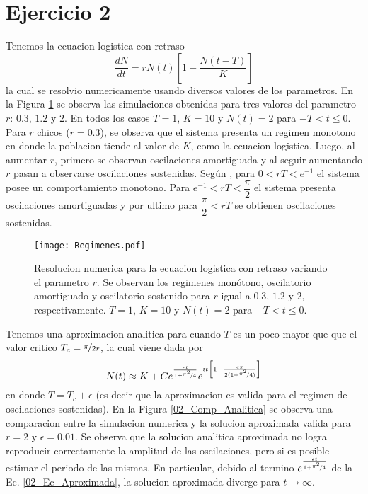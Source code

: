 \section*{Ejercicio 2}
\graphicspath{{Figuras/ej_02/}}

Tenemos la ecuacion logistica con retraso
\begin{equation}
    \frac{dN}{dt} = r N(t) \left[1- \frac{N(t-T)}{K}\right]
\end{equation}
la cual se resolvio numericamente usando diversos valores de los parametros. En la Figura \ref{02_ejercicio} se observa las simulaciones obtenidas para tres valores del parametro $r$: $0.3$, $1.2$ y $2$. En todos los casos $T=1$, $K=10$ y $N(t)=2$ para $-T < t \leq 0$. Para $r$ chicos ($r=0.3$), se observa que el sistema presenta un regimen monotono en donde la poblacion tiende al valor de $K$, como la ecuacion logistica. Luego, al aumentar $r$, primero se observan oscilaciones amortiguada y al seguir aumentando $r$ pasan a observarse oscilaciones sostenidas. Según \cite{Chule},  para $0<rT<e^{-1}$ el sistema posee un comportamiento monotono. Para $e^{-1} < rT < \dfrac{\pi}{2}$ el sistema presenta oscilaciones amortiguadas y por ultimo para $\dfrac{\pi}{2} < rT$ se obtienen oscilaciones sostenidas.

\begin{figure}
    \centering
    \texttt{[image: Regimenes.pdf]}
    \caption{Resolucion numerica para la ecuacion logistica con retraso variando el parametro $r$. Se observan los regimenes monótono, oscilatorio amortiguado y oscilatorio sostenido para $r$ igual a $0.3$, $1.2$ y $2$, respectivamente. $T=1$, $K=10$ y $N(t)=2$ para $-T < t \leq 0$.}
    \label{02_ejercicio}
\end{figure}

Tenemos una aproximacion analitica para cuando $T$ es un poco mayor que que el valor critico $T_c = \nicefrac{\pi}{2r}$, la cual viene dada por
\begin{equation}
    N(t) \approx K + C e^{ \frac{\epsilon t}{1 + \nicefrac{\pi^{2}}{4}} } e^{it \left[ 1- \frac{\epsilon \pi}{2 ( 1 + \nicefrac{\pi^{2}}{4})} \right]}
    \label{02_Ec_Aproximada}
\end{equation}
en donde $T = T_c + \epsilon$ (es decir que la aproximacion es valida para el regimen de oscilaciones sostenidas). En la Figura \ref{02_Comp_Analitica} se observa una comparacion entre la simulacion numerica y la solucion aproximada valida para $r=2$ y $\epsilon=0.01$. Se observa que la solucion analitica aproximada no logra reproducir correctamente la amplitud de las oscilaciones, pero si es posible estimar el periodo de las mismas. En particular, debido al termino $e^{ \frac{\epsilon t}{1 + \nicefrac{\pi^{2}}{4}} }$ de la Ec. \ref{02_Ec_Aproximada}, la solucion aproximada diverge para $t\rightarrow \infty$.

